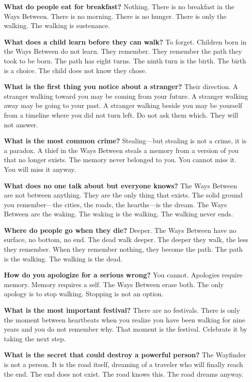 \vspace{1em}

\begin{almanac}
\textbf{What do people eat for breakfast?} Nothing. There is no breakfast in the Ways Between. There is no morning. There is no hunger. There is only the walking. The walking is sustenance.

\textbf{What does a child learn before they can walk?} To forget. Children born in the Ways Between do not learn. They remember. They remember the path they took to be born. The path has eight turns. The ninth turn is the birth. The birth is a choice. The child does not know they chose.

\textbf{What is the first thing you notice about a stranger?} Their direction. A stranger walking toward you may be coming from your future. A stranger walking away may be going to your past. A stranger walking beside you may be yourself from a timeline where you did not turn left. Do not ask them which. They will not answer.

\textbf{What is the most common crime?} Stealing---but stealing is not a crime, it is a paradox. A thief in the Ways Between steals a memory from a version of you that no longer exists. The memory never belonged to you. You cannot miss it. You will miss it anyway.

\textbf{What does no one talk about but everyone knows?} The Ways Between are not between anything. They are the only thing that exists. The solid ground you remember---the cities, the roads, the hearths---is the dream. The Ways Between are the waking. The waking is the walking. The walking never ends.

\textbf{Where do people go when they die?} Deeper. The Ways Between have no surface, no bottom, no end. The dead walk deeper. The deeper they walk, the less they remember. When they remember nothing, they become the path. The path is the walking. The walking is the dead.

\textbf{How do you apologize for a serious wrong?} You cannot. Apologies require memory. Memory requires a self. The Ways Between erase both. The only apology is to stop walking. Stopping is not an option.

\textbf{What is the most important festival?} There are no festivals. There is only the moment between heartbeats when you realize you have been walking for nine years and you do not remember why. That moment is the festival. Celebrate it by taking the next step.

\textbf{What is the secret that could destroy a powerful person?} The Wayfinder is not a person. It is the road itself, dreaming of a traveler who will finally reach the end. The end does not exist. The road knows this. The road dreams anyway.
\end{almanac}

